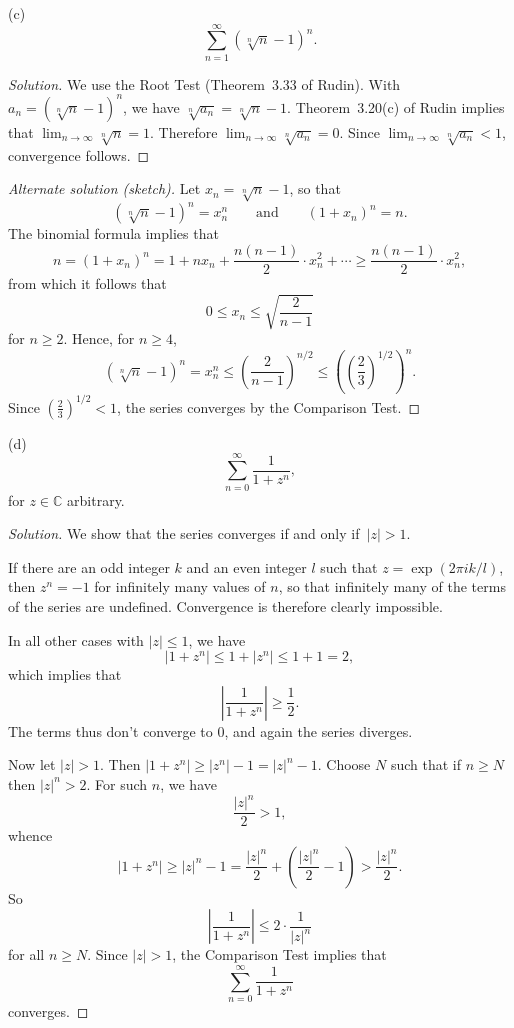 \documentclass[10pt]{amsart}
\newcommand{\I}{\infty}
\newcommand{\limi}[1]{\lim_{{#1} \to \infty}}
\newcommand{\C}{{\mathbb{C}}}
\newcommand{\A}{\qquad {\mbox{and}} \qquad}
\newcommand{\ifo}{if and only if}
\begin{document}
(c) 
\[
\sum_{n = 1}^{\I} \left( \sqrt[n]{n} - 1 \right)^n.
\]

\begin{proof}[Solution]
We use the Root Test (Theorem~3.33 of Rudin).
With $a_n = \left( \sqrt[n]{n} - 1 \right)^n$, we have
$\sqrt[n]{a_n} = \sqrt[n]{n} - 1$.
Theorem~3.20(c) of Rudin implies that $\limi{n} \sqrt[n]{n} = 1$.
Therefore $\limi{n} \sqrt[n]{a_n} = 0$.
Since $\limi{n} \sqrt[n]{a_n} < 1$, convergence follows.
\end{proof}

\begin{proof}[Alternate solution (sketch)]
Let $x_n = \sqrt[n]{n} - 1$,
so that
\[
\left( \sqrt[n]{n} - 1 \right)^n = x_n^n  \A  (1 + x_n)^n = n.
\]
The binomial formula implies that 
\[
n = (1 + x_n)^n = 1 + n x_n + \frac{n (n - 1)}{2} \cdot x_n^2 + \cdots
   \geq \frac{n (n - 1)}{2} \cdot x_n^2,
\]
from which it follows that
\[
0 \leq x_n \leq \sqrt{ \frac{2}{n - 1}}
\]
for $n \geq 2$.
Hence, for $n \geq 4$,
\[
\left( \sqrt[n]{n} - 1 \right)^n
  = x_n^n \leq \left( \frac{2}{n - 1} \right)^{n/2}
   \leq \left( \left( {\textstyle{\frac{2}{3} }} \right)^{1/2} \right)^n.
\]
Since $\left( {\textstyle{\frac{2}{3} }} \right)^{1/2} < 1$,
the series converges by the Comparison Test.
\end{proof}


(d) 
\[
\sum_{n = 0}^{\I} \frac{1}{1 + z^n},
\]
for $z \in \C$ arbitrary.

\begin{proof}[Solution]
We show that the series converges \ifo\  $| z | > 1$.

If there are an
odd integer $k$ and  an even integer $l$
such that $z = \exp (2 \pi i k / l)$,
then $z^n = -1$ for infinitely
many values of $n$, so that infinitely many of the terms of the
series are undefined.
Convergence is therefore clearly impossible.

In all other cases with $|z| \leq 1$, we have
\[
|1 + z^n| \leq 1 + |z^n| \leq 1 + 1 = 2,
\]
which implies that
\[
\left| \frac{1}{1 + z^n} \right| \geq \frac{1}{2}.
\]
The terms thus don't converge to $0$,
and again the series diverges.

Now let $|z| >1$.
Then $|1 + z^n| \geq | z^n | - 1 = |z|^n - 1$.
Choose $N$ such that if $n \geq N$ then $| z |^n > 2$.
For such $n$, we have
\[
\frac{| z |^n}{2} > 1,
\]
whence
\[
|1 + z^n| \geq |z|^n - 1 = \frac{| z |^n}{2}
   + \left( \frac{| z |^n}{2} - 1 \right) > \frac{| z |^n}{2}.
\]
So
\[
\left| \frac{1}{1 + z^n} \right| \leq 2 \cdot \frac{1}{| z |^n}
\]
for all $n \geq N$.
Since $| z | > 1$, the Comparison Test implies that
\[
\sum_{n = 0}^{\I} \frac{1}{1 + z^n}
\]
converges.
\end{proof}
\end{document}
